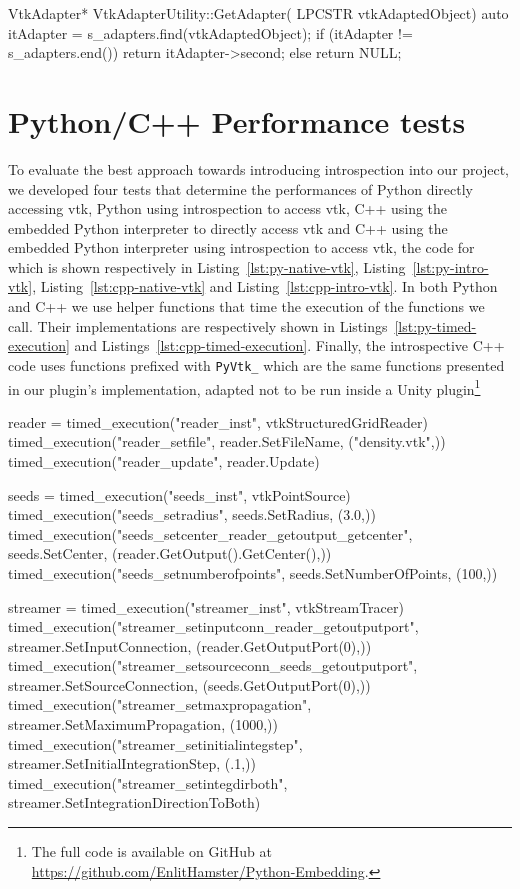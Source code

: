 \begin{appendices}
\begin{cpp}[label=lst:vtkadapterutilityex,caption={Example VtkAdapterUtility.cpp},aboveskip=20pt]
VtkAdapter* VtkAdapterUtility::GetAdapter(
	LPCSTR vtkAdaptedObject)
{
	auto itAdapter = s_adapters.find(vtkAdaptedObject);
	if (itAdapter != s_adapters.end())
	{
		return itAdapter->second;
	}
	else
	{
		return NULL;
	}
}
\end{cpp}
    
\chapter{Python/C++ Performance tests}
\label{apx:streamtracer-performance-tests}

To evaluate the best approach towards introducing introspection into our project, we developed four tests that determine the performances of Python directly accessing \acrshort{vtk}, Python using introspection to access \acrshort{vtk}, C++ using the embedded Python interpreter to directly access \acrshort{vtk} and C++ using the embedded Python interpreter using introspection to access \acrshort{vtk}, the code for which is shown respectively in Listing~\ref{lst:py-native-vtk}, Listing~\ref{lst:py-intro-vtk}, Listing~\ref{lst:cpp-native-vtk} and Listing~\ref{lst:cpp-intro-vtk}. In both Python and C++ we use helper functions that time the execution of the functions we call. Their implementations are respectively shown in Listings~\ref{lst:py-timed-execution} and Listings~\ref{lst:cpp-timed-execution}. Finally, the introspective C++ code uses functions prefixed with \verb|PyVtk_| which are the same functions presented in our plugin's implementation, adapted not to be run inside a Unity plugin\footnote{The full code is available on GitHub at \url{https://github.com/EnlitHamster/Python-Embedding}.}

\begin{python}[label=lst:py-native-vtk,caption={Native Python VTK benchmark script},aboveskip=20pt]
reader = timed_execution("reader_inst", vtkStructuredGridReader)
timed_execution("reader_setfile", reader.SetFileName, ("density.vtk",))
timed_execution("reader_update", reader.Update)

seeds = timed_execution("seeds_inst", vtkPointSource)
timed_execution("seeds_setradius", seeds.SetRadius, (3.0,))
timed_execution("seeds_setcenter_reader_getoutput_getcenter", seeds.SetCenter, (reader.GetOutput().GetCenter(),))
timed_execution("seeds_setnumberofpoints", seeds.SetNumberOfPoints, (100,))

streamer = timed_execution("streamer_inst", vtkStreamTracer)
timed_execution("streamer_setinputconn_reader_getoutputport", streamer.SetInputConnection, (reader.GetOutputPort(0),))
timed_execution("streamer_setsourceconn_seeds_getoutputport", streamer.SetSourceConnection, (seeds.GetOutputPort(0),))
timed_execution("streamer_setmaxpropagation", streamer.SetMaximumPropagation, (1000,))
timed_execution("streamer_setinitialintegstep", streamer.SetInitialIntegrationStep, (.1,))
timed_execution("streamer_setintegdirboth", streamer.SetIntegrationDirectionToBoth)


\end{python}
\end{appendices}
